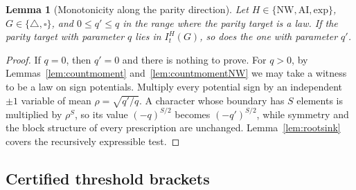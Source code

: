 \documentclass[11pt]{article}
\theoremstyle{plain}
\newtheorem{lemma}[theorem]{Lemma}
\theoremstyle{definition}
\begin{document}
\begin{lemma}[Monotonicity along the parity direction]\label{lem:paritymonotone}
Let $H\in\{\mathrm{NW},\mathrm{AI},\mathrm{exp}\}$, $G\in\{\triangle,\square\}$, and $0\le q'\le q$ in the range where the parity target is a law. If the parity target with parameter $q$ lies in $I^H_t(G)$, so does the one with parameter $q'$.
\end{lemma}

\begin{proof}
If $q=0$, then $q'=0$ and there is nothing to prove. For $q>0$, by Lemmas~\ref{lem:countmoment} and~\ref{lem:countmomentNW} we may take a witness to be a law on sign potentials. Multiply every potential sign by an independent $\pm1$ variable of mean $\rho=\sqrt{q'/q}$. A character whose boundary has $S$ elements is multiplied by $\rho^S$, so its value $(-q)^{S/2}$ becomes $(-q')^{S/2}$, while symmetry and the block structure of every prescription are unchanged. Lemma~\ref{lem:rootsink} covers the recursively expressible test.
\end{proof}


\subsection{Certified threshold brackets}\label{app:thresholds}
\end{document}
